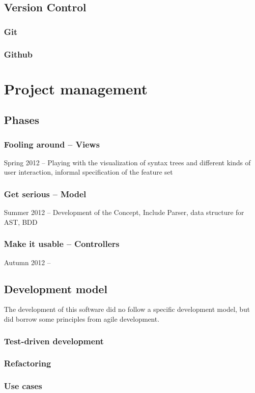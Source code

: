 \subsection{Version Control}

\subsubsection{Git}

\subsubsection{Github}

\section{Project management}

\subsection{Phases}

\subsubsection{Fooling around – Views}

Spring 2012 – Playing with the visualization of syntax trees and different kinds of user interaction, informal specification of the feature set

\subsubsection{Get serious – Model}

Summer 2012 – Development of the Concept, Include Parser, data structure for AST, BDD

\subsubsection{Make it usable – Controllers}

Autumn 2012 – 

\subsection{Development model}

The development of this software did no follow a specific development model, 
but did borrow some principles from agile development.

\subsubsection{Test-driven development}

\subsubsection{Refactoring}

\subsubsection{Use cases}
